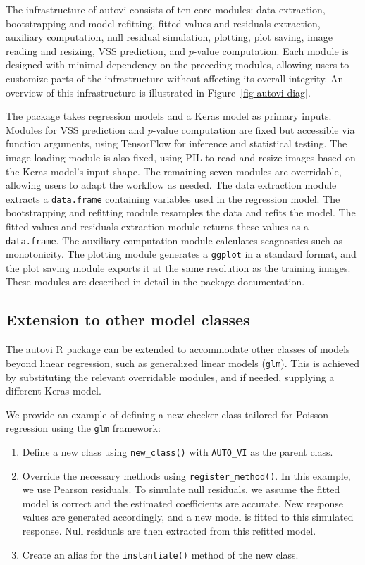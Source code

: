 \documentclass[
doublespace,
  times]{anzsauth}
\providecommand{\tightlist}{%
  \setlength{\itemsep}{0pt}\setlength{\parskip}{0pt}}\usepackage{longtable,booktabs,array}
\begin{document}
The infrastructure of \textsf{autovi} consists of ten core modules: data
extraction, bootstrapping and model refitting, fitted values and
residuals extraction, auxiliary computation, null residual simulation,
plotting, plot saving, image reading and resizing, VSS prediction, and
\(p\)-value computation. Each module is designed with minimal dependency
on the preceding modules, allowing users to customize parts of the
infrastructure without affecting its overall integrity. An overview of
this infrastructure is illustrated in Figure~\ref{fig-autovi-diag}.

The package takes regression models and a \textsf{Keras} model as
primary inputs. Modules for VSS prediction and \(p\)-value computation
are fixed but accessible via function arguments, using
\textsf{TensorFlow} for inference and statistical testing. The image
loading module is also fixed, using \textsf{PIL} to read and resize
images based on the \textsf{Keras} model's input shape. The remaining
seven modules are overridable, allowing users to adapt the workflow as
needed. The data extraction module extracts a \texttt{data.frame}
containing variables used in the regression model. The bootstrapping and
refitting module resamples the data and refits the model. The fitted
values and residuals extraction module returns these values as a
\texttt{data.frame}. The auxiliary computation module calculates
scagnostics such as monotonicity. The plotting module generates a
\texttt{ggplot} in a standard format, and the plot saving module exports
it at the same resolution as the training images. These modules are
described in detail in the package documentation.

\subsection{Extension to other model
classes}\label{extension-to-other-model-classes}

The \textsf{autovi} \textsf{R} package can be extended to accommodate
other classes of models beyond linear regression, such as generalized
linear models (\texttt{glm}). This is achieved by substituting the
relevant overridable modules, and if needed, supplying a different
\textsf{Keras} model.

We provide an example of defining a new checker class tailored for
Poisson regression using the \texttt{glm} framework:

\begin{enumerate}
\def\labelenumi{\arabic{enumi}.}
\tightlist
\item
  Define a new class using \texttt{new\_class()} with \texttt{AUTO\_VI}
  as the parent class.
\item
  Override the necessary methods using \texttt{register\_method()}. In
  this example, we use Pearson residuals. To simulate null residuals, we
  assume the fitted model is correct and the estimated coefficients are
  accurate. New response values are generated accordingly, and a new
  model is fitted to this simulated response. Null residuals are then
  extracted from this refitted model.
\item
  Create an alias for the \texttt{instantiate()} method of the new
  class.
\end{enumerate}
\end{document}
